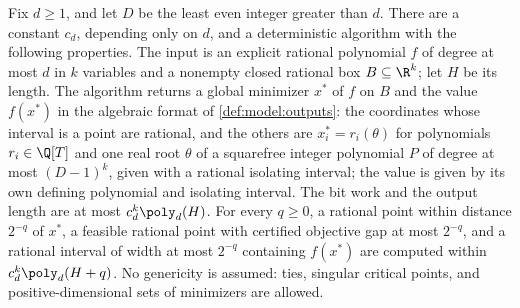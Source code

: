 \begin{theorem}\label{thm:int:solver}
Fix $d\ge1$, and let $D$ be the least even integer greater than $d$. There
are a constant $c_d$, depending only on $d$, and a deterministic algorithm
with the following properties. The input is an explicit rational polynomial
$f$ of degree at most $d$ in $k$ variables and a nonempty closed rational box
$B\subseteq\R^k$; let $H$ be its length. The algorithm returns a global
minimizer $x^*$ of $f$ on $B$ and the value $f(x^*)$ in the algebraic format
of \cref{def:model:outputs}: the coordinates whose interval is a point are
rational, and the others are $x^*_i=r_i(\theta)$ for polynomials
$r_i\in\Q[T]$ and one real root $\theta$ of a squarefree integer polynomial
$P$ of degree at most $(D-1)^k$, given with a rational isolating interval;
the value is given by its own defining polynomial and isolating interval.
The bit work and the output length are at most $c_d^k\poly_d(H)$. For every
$q\ge0$, a rational point within distance $2^{-q}$ of $x^*$, a feasible
rational point with certified objective gap at most $2^{-q}$, and a rational
interval of width at most $2^{-q}$ containing $f(x^*)$ are computed within
$c_d^k\poly_d(H+q)$. No genericity is assumed: ties, singular critical points,
and positive-dimensional sets of minimizers are allowed.
\end{theorem}

